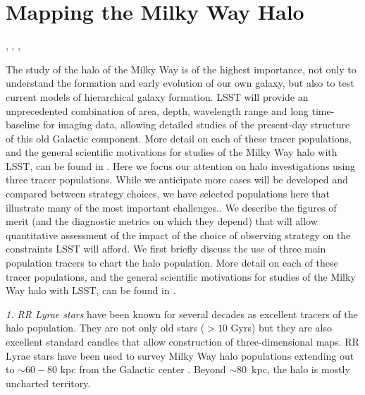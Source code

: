 %
%
%

\section{Mapping the Milky Way Halo}
\def\secname{MW_Halo}\label{sec:\secname}

, , , 

The study of the halo of the Milky Way is of the highest importance,
not only to understand the formation and early evolution of our own
galaxy, but also to test current models of hierarchical galaxy
formation. LSST will provide an unprecedented combination of area,
depth, wavelength range and long time-baseline for imaging data,
allowing detailed studies of the present-day structure of this old
Galactic component. More detail on each of these tracer populations,
and the general scientific motivations for studies of the Milky Way
halo with LSST, can be found in \citet{2009arXiv0912.0201L}. Here we
focus our attention on halo investigations using three tracer
populations. While we anticipate more cases will be developed and
compared between strategy choices, we have selected populations here
that illustrate many of the most important challenges..
We describe the figures of merit (and the
diagnostic metrics on which they depend) that will allow quantitative
assessment of the impact of the choice of observing strategy on the
constraints LSST will afford.
We first briefly discuss the use of three main population tracers to
chart the halo population. More detail on each of these tracer
populations, and the general scientific motivations for studies of the
Milky Way halo with LSST, can be found in \citet{2009arXiv0912.0201L}.

{\it 1. RR Lyrae stars} have been known for several decades as
excellent tracers of the halo population. They are not only old stars
($>10$ Gyrs) but they are also excellent standard candles that allow
construction of three-dimensional maps. RR Lyrae stars have been used
to survey Milky Way halo populations extending out to
$\sim 60-80$ kpc from the Galactic center \citep[][among
  others]{drake13a,drake13b,zinn14,torrealba15}. Beyond $\sim 80$~kpc,
the halo is mostly uncharted territory.

